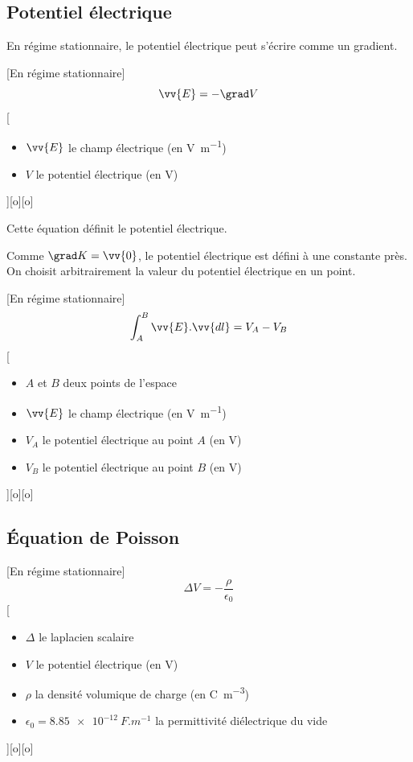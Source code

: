 
\subsection{Potentiel électrique}

En régime stationnaire, le potentiel électrique peut s'écrire comme un gradient.

[En régime stationnaire]
{$$\vv{E}=-\grad V$$}
[
    \begin{itemize}
        \item $\vv{E}$ le champ électrique (en \unit{V.m^{-1}})
        \item $V$ le potentiel électrique (en \unit{V})
    \end{itemize}
][o][o]


Cette équation définit le potentiel électrique.

Comme $\grad K=\vv{0}$, le potentiel électrique est défini à une constante près. On choisit arbitrairement la valeur du potentiel électrique en un point.

[En régime stationnaire]
{$$\int_A^B\vv{E}.\vv{dl}=V_A-V_B$$}
[
    \begin{itemize}
        \item $A$ et $B$ deux points de l'espace
        \item $\vv{E}$ le champ électrique (en \unit{V.m^{-1}})
        \item $V_A$ le potentiel électrique au point $A$ (en \unit{V})
        \item $V_B$ le potentiel électrique au point $B$ (en \unit{V})
    \end{itemize}
][o][o]



\subsection{Équation de Poisson}

[En régime stationnaire]
{$$\Delta V=-\frac{\rho}{\epsilon_0}$$}
[
    \begin{itemize}
        \item $\Delta$ le laplacien scalaire
        \item $V$ le potentiel électrique (en \unit{V})
        \item $\rho$ la densité volumique de charge (en \unit{C.m^{-3}})
        \item $\epsilon_0=\SI{8.85e-12}{F.m^{-1}}$ la permittivité diélectrique du vide
    \end{itemize}
][o][o]

